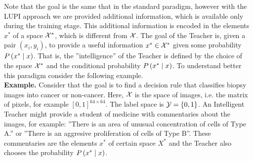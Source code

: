 Note that the goal is the same that in the standard paradigm, however with the LUPI approach we are provided additional information, which is available only during the training stage. This additional information is encoded in the elements $x^*$ of a space $\mathcal{X}^*$, which is different from $\mathcal{X}$. The goal of the Teacher is, given a pair $(x_i, y_i)$, to provide a useful information $x^* \in \mathcal{X}^*$ given some probability $P\left( x^* \;\middle\vert\; x \right)$. That is, the ''intelligence'' of the Teacher is defined by the choice of the space $\mathcal{X}^*$ and the conditional probability $P\left( x^* \;\middle\vert\; x \right)$. 
To understand better this paradigm consider the following example.
\\
\textbf{Example.} Consider that the goal is to find a decision rule that classifies biopsy images into cancer or non-cancer. Here, $\mathcal{X}$ is the space of images, i.e. the matrix of pixels, for example $[0, 1]^{64 \times 64}$. The label space is $\mathcal{Y} = \left\{0, 1\right\}$. An Intelligent Teacher might provide a student of medicine with commentaries about the images, for example: ''There is an area of unusual concentration of cells of Type A.'' or ''There is an aggresive proliferation of cells of Type B''. These commentaries are the elements $x^*$ of certain space $X^*$ and the Teacher also chooses the probability $P\left( x^* \;\middle\vert\; x \right)$.

